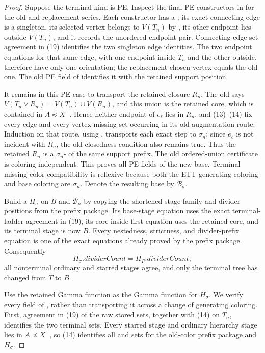 \begin{proof}
Suppose the terminal kind is PE.  Inspect the final PE constructors in
 for the old and replacement series.  Each
constructor has a ; its exact connecting
edge is a singleton, its selected vertex belongs to \(V(T_n)\) by
, its other endpoint lies outside \(V(T_n)\), and
it records the unordered endpoint pair.  Connecting-edge-set agreement in
(19) identifies the two singleton edge identities.  The two endpoint
equations for that same edge, with one endpoint inside \(T_n\) and the other
outside, therefore have only one orientation; the replacement chosen
vertex equals the old one.  The old PE field of
 identifies it with the retained support position.

It remains in this PE case to transport the retained closure \(R_n\).
The old  says
\(V(T_n\vee R_n)=V(T_n)\cup V(R_n)\), and this union is the retained core,
which is contained in \(A\preccurlyeq X^-\).  Hence neither endpoint of
\(e_\ell\) lies in \(R_n\), and (13)--(14) fix every edge and every
vertex-missing set occurring in its old augmentation route.  Induction on
that route, using , transports each exact
step to \(\sigma_n\); since \(e_\ell\) is not incident with \(R_n\), the
old closedness condition also remains true.  Thus the retained \(R_n\) is
a \(\sigma_n\)- of the same support prefix.
The old ordered-union certificate is coloring-independent.  This proves
all PE fields of the new base.  Terminal missing-color compatibility is
reflexive because both the ETT generating coloring and base coloring are
\(\sigma_n\).  Denote the resulting base by \(\mathcal B_\sigma\).

Build a  \(H_\sigma\) on \(B\) and
\(\mathcal B_\sigma\) by copying the shortened stage family and divider
positions from the prefix package.  Its base-stage equation uses the exact
terminal-ladder agreement in (19), its core-inside-first equation uses the
retained core, and its terminal stage is now \(B\).  Every nestedness,
strictness, and divider-prefix equation is one of the exact equations
already proved by the prefix package.  Consequently
\[
 H_\sigma.\mathit{dividerCount}=H_P.\mathit{dividerCount},     \tag{21}
\]
all nonterminal ordinary and starred stages agree, and only the terminal
tree has changed from \(T\) to \(B\).

Use the retained Gamma function as the Gamma function for \(H_\sigma\).
We verify every field of , rather than transporting
it across a change of generating coloring.  First, agreement in (19) of
the raw stored sets, together with (14) on \(T_n\), identifies the two
terminal  sets.  Every starred stage and
ordinary hierarchy stage lies in \(A\preccurlyeq X^-\), so (14) identifies
all  and
 sets for the old-color prefix package
and \(H_\sigma\).


\end{proof}
